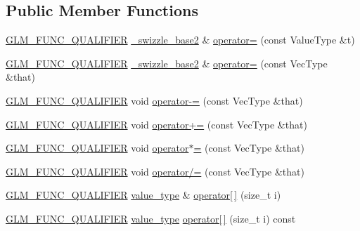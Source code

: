 \subsection*{Public Member Functions}
\begin{DoxyCompactItemize}
\item 
\hyperlink{setup_8hpp_a33fdea6f91c5f834105f7415e2a64407}{G\+L\+M\+\_\+\+F\+U\+N\+C\+\_\+\+Q\+U\+A\+L\+I\+F\+I\+ER} \hyperlink{structglm_1_1detail_1_1__swizzle__base2}{\+\_\+swizzle\+\_\+base2} \& \hyperlink{structglm_1_1detail_1_1__swizzle__base2_a70442376cb261474e23090737deff976}{operator=} (const Value\+Type \&t)
\item 
\hyperlink{setup_8hpp_a33fdea6f91c5f834105f7415e2a64407}{G\+L\+M\+\_\+\+F\+U\+N\+C\+\_\+\+Q\+U\+A\+L\+I\+F\+I\+ER} \hyperlink{structglm_1_1detail_1_1__swizzle__base2}{\+\_\+swizzle\+\_\+base2} \& \hyperlink{structglm_1_1detail_1_1__swizzle__base2_a7b982a5056d94cd43393bf820ea627d0}{operator=} (const Vec\+Type \&that)
\item 
\hyperlink{setup_8hpp_a33fdea6f91c5f834105f7415e2a64407}{G\+L\+M\+\_\+\+F\+U\+N\+C\+\_\+\+Q\+U\+A\+L\+I\+F\+I\+ER} void \hyperlink{structglm_1_1detail_1_1__swizzle__base2_ab583f399dc6685deee97bdd5126f433a}{operator-\/=} (const Vec\+Type \&that)
\item 
\hyperlink{setup_8hpp_a33fdea6f91c5f834105f7415e2a64407}{G\+L\+M\+\_\+\+F\+U\+N\+C\+\_\+\+Q\+U\+A\+L\+I\+F\+I\+ER} void \hyperlink{structglm_1_1detail_1_1__swizzle__base2_a5e734b2e9da294d92bb347a3c7f44ded}{operator+=} (const Vec\+Type \&that)
\item 
\hyperlink{setup_8hpp_a33fdea6f91c5f834105f7415e2a64407}{G\+L\+M\+\_\+\+F\+U\+N\+C\+\_\+\+Q\+U\+A\+L\+I\+F\+I\+ER} void \hyperlink{structglm_1_1detail_1_1__swizzle__base2_a6c686d110b936939c7ed67d7a6165778}{operator$\ast$=} (const Vec\+Type \&that)
\item 
\hyperlink{setup_8hpp_a33fdea6f91c5f834105f7415e2a64407}{G\+L\+M\+\_\+\+F\+U\+N\+C\+\_\+\+Q\+U\+A\+L\+I\+F\+I\+ER} void \hyperlink{structglm_1_1detail_1_1__swizzle__base2_a0a3e5ef1cb68f78a7e1bcd72f6e2dc4c}{operator/=} (const Vec\+Type \&that)
\item 
\hyperlink{setup_8hpp_a33fdea6f91c5f834105f7415e2a64407}{G\+L\+M\+\_\+\+F\+U\+N\+C\+\_\+\+Q\+U\+A\+L\+I\+F\+I\+ER} \hyperlink{structglm_1_1detail_1_1__swizzle__base2_a656c11aaeeaca042deed88711c9dc063}{value\+\_\+type} \& \hyperlink{structglm_1_1detail_1_1__swizzle__base2_aa3f2ab8e3e1a5c414b3fdca4cf75b706}{operator\mbox{[}$\,$\mbox{]}} (size\+\_\+t i)
\item 
\hyperlink{setup_8hpp_a33fdea6f91c5f834105f7415e2a64407}{G\+L\+M\+\_\+\+F\+U\+N\+C\+\_\+\+Q\+U\+A\+L\+I\+F\+I\+ER} \hyperlink{structglm_1_1detail_1_1__swizzle__base2_a656c11aaeeaca042deed88711c9dc063}{value\+\_\+type} \hyperlink{structglm_1_1detail_1_1__swizzle__base2_a8ec8dce75738c37d06b96d18dec0adb5}{operator\mbox{[}$\,$\mbox{]}} (size\+\_\+t i) const
\end{DoxyCompactItemize}
